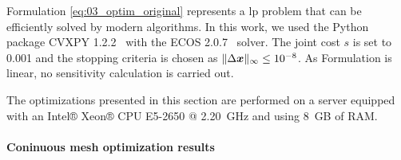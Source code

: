 Formulation \ref{eq:03_optim_original} represents a \gls{lp} problem that can be efficiently solved by modern algorithms. In this work, we used the Python package CVXPY 1.2.2~ with the ECOS 2.0.7~ solver. The joint cost $s$ is set to 0.001 and the stopping criteria is chosen as $\lVert\Delta \bm{x}\rVert_\infty \leq 10^{-8}$. As Formulation is linear, no sensitivity calculation is carried out.

The optimizations presented in this section are performed on a server equipped with an Intel® Xeon® CPU E5-2650 @ \qty{2.20}{GHz} and using \qty{8}{GB} of RAM.

\paragraph{Coninuous mesh optimization results}
